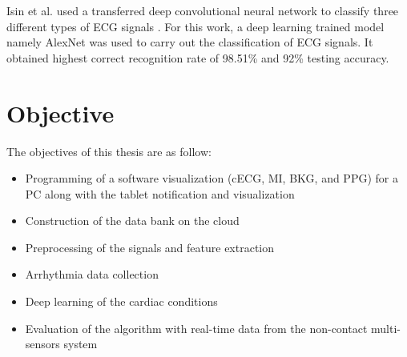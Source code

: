 
Isin et al. used a transferred deep convolutional neural network to classify three different types of ECG signals \cite{Isin2017268}. For this work, a deep learning trained model namely AlexNet was used to carry out the classification of ECG signals. It obtained highest correct recognition rate of 98.51\% and 92\% testing accuracy.


\section{Objective}

The objectives of this thesis are as follow:

\begin{itemize}
	\item Programming of a software visualization (cECG, MI, BKG, and PPG) for a PC along with the tablet notification and visualization
	\item Construction of the data bank on the cloud
	\item Preprocessing of the signals and feature extraction
	\item Arrhythmia data collection
	\item Deep learning of the cardiac conditions
	\item Evaluation of the algorithm with real-time data from the non-contact multi-sensors system
\end{itemize}


